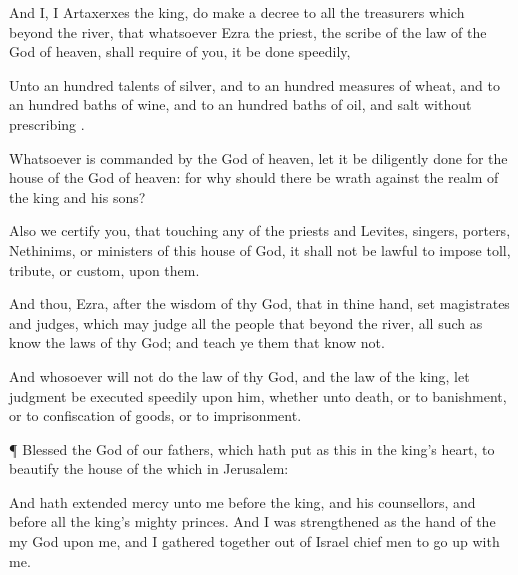 {And
I,
{}
I
Artaxerxes the
king, do
make a
decree to
all the
treasurers which
{}
beyond the
river, that whatsoever
Ezra the
priest, the
scribe of the
law of the
God of
heaven, shall
require of you, it be
done
speedily,

Unto an
hundred
talents of
silver, and to an
hundred
measures of
wheat, and to an
hundred
baths of
wine, and to an
hundred
baths of
oil, and
salt
without
prescribing
{}.

Whatsoever is commanded
by the
God of
heaven, let it be
diligently
done for the
house of the
God of
heaven:
for
why should there
be
wrath
against the
realm of the
king and his
sons?

Also we
certify you, that touching
any of the
priests and
Levites,
singers,
porters,
Nethinims, or
ministers of
this
house of
God, it shall
not be
lawful to
impose
toll,
tribute, or
custom,
upon them.

And
thou,
Ezra, after the
wisdom of thy
God, that
{} in thine
hand,
set
magistrates and
judges, which may
judge
all the
people that
{}
beyond the
river,
all such as
know the
laws of thy
God; and
teach ye them that
know
{}
not.

And
whosoever will
not
do the
law of thy
God, and the
law of the
king, let
judgment
be
executed
speedily upon
him,
whether
{} unto
death,
or to
banishment,
or to
confiscation of
goods, or to
imprisonment.


\par }{\PP {}¶
Blessed
{} the
{}
God of our
fathers, which hath
put
{} as this in the
king’s
heart, to
beautify the
house of the
{} which
{} in
Jerusalem:

And hath
extended
mercy unto me
before the
king, and his
counsellors, and before all the
king’s
mighty
princes. And I was
strengthened as the
hand of the
{} my
God
{} upon me, and I gathered
together out of
Israel chief
men to go
up with me.




\par }

